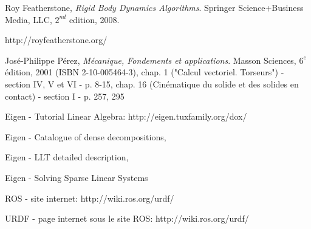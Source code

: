 
\begin{thebibliography}{9}

  Roy Featherstone,
  \emph{Rigid Body Dynamics Algorithms}.
  Springer Science+Business Media, LLC,
  $2^{nd}$ edition,
  2008.

  http://royfeatherstone.org/

  
  José-Philippe Pérez,
  \emph{Mécanique, Fondements et applications}.
  Masson Sciences,
  $6^{e}$ édition, 2001 (ISBN 2-10-005464-3),
  chap. 1 ("Calcul vectoriel. Torseurs") - section IV, V et VI - p. 8-15, 
  chap. 16 (Cinématique du solide et des solides en contact) - section I - p. 257, 295
  
  Eigen - Tutorial Linear Algebra:
  http://eigen.tuxfamily.org/dox/%
  
  Eigen - Catalogue of dense decompositions,
  
  Eigen - LLT detailed description,

  Eigen - Solving Sparse Linear Systems





  ROS - site internet:
  http://wiki.ros.org/urdf/

  URDF - page internet sous le site ROS:
  http://wiki.ros.org/urdf/




\end{thebibliography}
